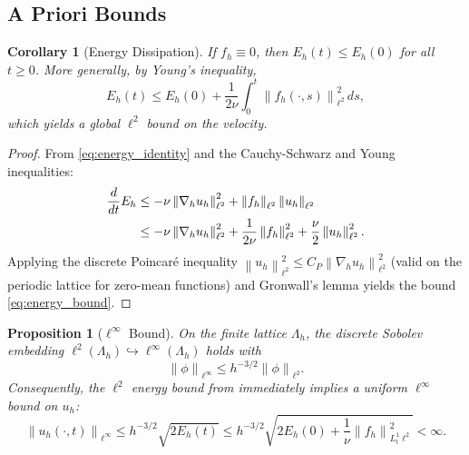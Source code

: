 \documentclass[12pt, a4paper]{article}
\theoremstyle{plain}
\newtheorem{proposition}[theorem]{Proposition}
\newtheorem{corollary}[theorem]{Corollary}
\theoremstyle{definition}
\theoremstyle{remark}
\newcommand{\norm}[1]{\left\| #1 \right\|}
\newcommand{\grad}{\nabla_h}
\newcommand{\uh}{u_h}
\begin{document}
\subsection{A Priori Bounds}

\begin{corollary}[Energy Dissipation]\label{cor:dissipation}
  If $f_h \equiv 0$, then $E_h(t) \leq E_h(0)$ for all $t \geq 0$.
  More generally, by Young's inequality,
  \begin{equation}\label{eq:energy_bound}
    E_h(t) \leq E_h(0) + \frac{1}{2\nu} \int_0^t \norm{f_h(\cdot,s)}_{\ell^2}^2 \, ds,
  \end{equation}
  which yields a global $\ell^2$ bound on the velocity.
\end{corollary}

\begin{proof}
  From \eqref{eq:energy_identity} and the Cauchy-Schwarz and Young inequalities:
  \begin{align}
    \frac{d}{dt}E_h
    &\leq -\nu\norm{\grad\uh}_{\ell^2}^2 + \norm{f_h}_{\ell^2}\norm{\uh}_{\ell^2} \notag \\
    &\leq -\nu\norm{\grad\uh}_{\ell^2}^2 + \frac{1}{2\nu}\norm{f_h}_{\ell^2}^2
      + \frac{\nu}{2}\norm{\uh}_{\ell^2}^2.
  \end{align}
  Applying the discrete Poincar\'e inequality
  $\norm{\uh}_{\ell^2}^2 \leq C_P \norm{\grad\uh}_{\ell^2}^2$
  (valid on the periodic lattice for zero-mean functions) and Gronwall's
  lemma \citep{Gronwall1919} yields the bound \eqref{eq:energy_bound}.
\end{proof}

\begin{proposition}[$\ell^\infty$ Bound]\label{prop:linfty}
  On the finite lattice $\Lambda_h$, the discrete Sobolev embedding
  $\ell^2(\Lambda_h) \hookrightarrow \ell^\infty(\Lambda_h)$ holds with
  \begin{equation}\label{eq:sobolev_embed}
    \norm{\phi}_{\ell^\infty} \leq h^{-3/2} \norm{\phi}_{\ell^2}.
  \end{equation}
  Consequently, the $\ell^2$ energy bound from 
  immediately implies a uniform $\ell^\infty$ bound on $\uh$:
  \begin{equation}
    \norm{\uh(\cdot,t)}_{\ell^\infty} \leq h^{-3/2} \sqrt{2E_h(t)}
    \leq h^{-3/2} \sqrt{2E_h(0) + \frac{1}{\nu}\norm{f_h}_{L^1_t \ell^2}^2} < \infty.
  \end{equation}
\end{proposition}
\end{document}
